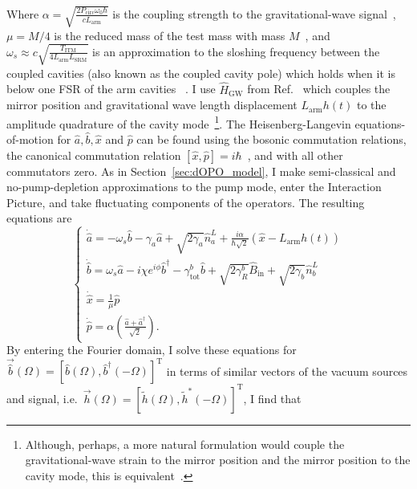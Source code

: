 Where $\alpha=\sqrt{\frac{2 P_\text{circ} \omega_0 \hbar}{c  L_\text{arm}}}$  is the coupling strength to the gravitational-wave signal~\cite{}, $\mu=M/4$ is the reduced mass  of the test mass with mass $M$~\cite{}, and $\omega_s\approx c\sqrt{\frac{T_\text{ITM}}{4 L_\text{arm} L_\text{SRM}}}$ is an approximation to the sloshing frequency between the coupled cavities (also known as the coupled cavity pole) which holds when it is below one FSR of the arm cavities ~\cite{}. I use $\hat H_\text{GW}$ from Ref.~\cite{Li2020,original source?} which couples the mirror position and gravitational wave length displacement $L_\text{arm} h(t)$ to the amplitude quadrature of the cavity mode~\footnote{Although, perhaps, a more natural formulation would couple the gravitational-wave strain to the mirror position and the mirror position to the cavity mode, this is equivalent~\cite{}.}. 
The Heisenberg-Langevin equations-of-motion for $\hat a, \hat b, \hat x$ and $\hat p$ can be found using the bosonic commutation relations, the canonical commutation relation $[\hat x,\hat p]=i\hbar$~\cite{}, and with all other commutators zero. As in Section~\ref{sec:dOPO_model}, I make semi-classical and no-pump-depletion approximations to the pump mode, enter the Interaction Picture, and take fluctuating components of the operators. The resulting equations are
\begin{equation}\label{eq:dIS_EoM}\begin{cases}
\dot{\hat a}=-\omega_s \hat b- \gamma_a \hat{a} + \sqrt{2\gamma_a}\hat{n}^L_a+\frac{i \alpha}{\hbar\sqrt2}(\hat{x}-L_\mathrm{arm}h(t)) \\
\dot{\hat b}=\omega_s \hat a-i\chi e^{i\phi} \hat b^\dag - \gamma^b_\mathrm{tot} \hat{b} + \sqrt{2\gamma^b_R}\hat{B}_\mathrm{in} + \sqrt{2\gamma_b}\hat{n}^L_b\\
\dot{\hat x}=\frac{1}{\mu}\hat p\\
\dot{\hat p}=\alpha\left(\frac{\hat{a}+\hat{a}^\dag}{\sqrt{2}}\right).
\end{cases}\end{equation}
By entering the Fourier domain, I solve these equations for $\vec{\hat b}(\Omega)=[\hat b(\Omega),\hat b^\dag(-\Omega)]^\text{T}$ in terms of similar vectors of the vacuum sources and signal, i.e.\ $\vec h(\Omega)=[\tilde h(\Omega),\tilde h^*(-\Omega)]^\text{T}$, I find that
